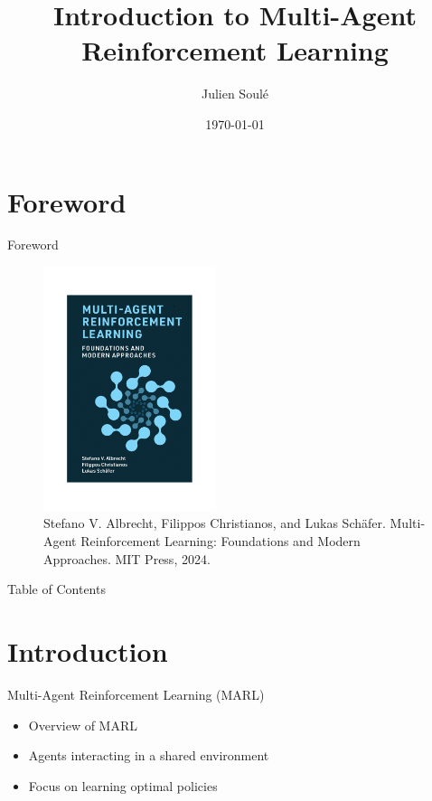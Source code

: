 \documentclass{beamer}
\title{Introduction to Multi-Agent Reinforcement Learning}
\author{Julien Soulé}
\institute{$CO^{4}SYS$ Team, LCIS Lab}
\date{\today}
\begin{document}
\begin{frame}
  \titlepage
\end{frame}

\section*{Foreword}
\begin{frame}{Foreword}
  \begin{figure}
    \centering
    \includegraphics[width=0.45\textwidth]{figures/marl-book-cover.png}
    \caption{Stefano V. Albrecht, Filippos Christianos, and Lukas Schäfer. Multi-Agent Reinforcement Learning: Foundations and Modern Approaches. MIT Press, 2024.}
  \end{figure}
\end{frame}

\begin{frame}{Table of Contents}
  \tableofcontents
\end{frame}

\section{Introduction}

\begin{frame}{Multi-Agent Reinforcement Learning (MARL)}
  \begin{itemize}
    \item Overview of MARL
    \item Agents interacting in a shared environment
    \item Focus on learning optimal policies
  \end{itemize}
\end{frame}
\end{document}
